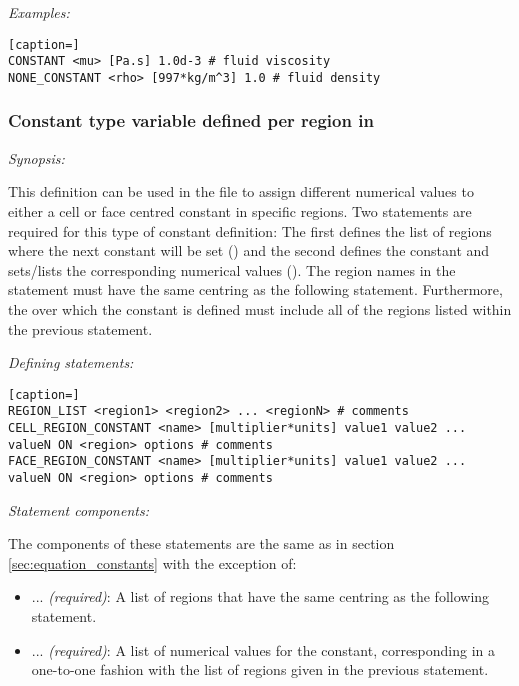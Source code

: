 \emph{Examples:}

\begin{lstlisting}[caption=]
CONSTANT <mu> [Pa.s] 1.0d-3 # fluid viscosity
NONE_CONSTANT <rho> [997*kg/m^3] 1.0 # fluid density
\end{lstlisting}

\subsubsection{Constant type variable defined per region in }

\emph{Synopsis:}

This definition can be used in the  file to assign different numerical values to either a cell or face centred constant in specific regions.  Two statements are required for this type of constant definition:  The first defines the list of regions where the next constant will be set () and the second defines the constant and sets/lists the corresponding numerical values ().  The region names in the  statement must have the same centring as the following  statement.  Furthermore, the  over which the constant is defined must include all of the regions listed within the previous  statement.

\emph{Defining statements:}

\begin{lstlisting}[caption=]
REGION_LIST <region1> <region2> ... <regionN> # comments
CELL_REGION_CONSTANT <name> [multiplier*units] value1 value2 ... valueN ON <region> options # comments
FACE_REGION_CONSTANT <name> [multiplier*units] value1 value2 ... valueN ON <region> options # comments
\end{lstlisting}

\emph{Statement components:}

The components of these statements are the same as in section \ref{sec:equation_constants} with the exception of:
\begin{itemize}
\item {}  ...  \emph{(required)}:  A list of regions that have the same centring as the following  statement.
\item {}  ...  \emph{(required)}:  A list of numerical values for the constant, corresponding in a one-to-one fashion with the list of regions given in the previous  statement.
\end{itemize}

